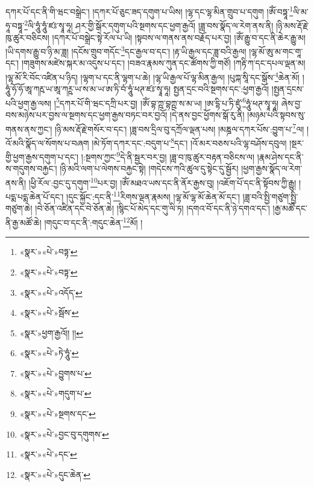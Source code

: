 དཀར་པོ་དང་ནི་གི་ཝང་བསྒྲེང་། །དཀར་པོ་ཅུང་ཟད་དགུག་པ་ཡིས། །ལྷ་དང་ལྷ་མིན་གྲུབ་པ་དགུག །ཨོཾ་བཏྟཱ་\footnote{«སྣར་»«པེ་»བཏྟ་}ལི་མ་ཧཱ་བཏྟཱ་\footnote{«སྣར་»«པེ་»བཏྟ་}ལི་ཧཱུཾ་ཧཱུཾ་ཛཿ་སྭཱ་ཧཱ། ཤར་གྱི་སྒོར་དགུག་པའི་སྔགས་དང་ཕྱག་རྒྱའོ། །ཟླ་བས་སྣོད་ལ་རེག་ནས་ནི། །ཉི་མས་རྡོ་རྗེ་ཁུ་ཚུར་བཅིངས། །དཀར་པོ་བསྒྲེང་སྟེ་རོལ་པ་ཡི། །སྟབས་ལ་གནས་ནས་བརྗོད་པར་བྱ། །ཨོཾ་རྒྱུ་བ་དང་ནི་ཆེར་རྒྱུ་མ། །ཡི་དགས་རྒྱུ་བ་ཉི་མ་ཟླ། །དངོས་གྲུབ་གདོང་\footnote{«སྣར་»«པེ་»འདོད་}དང་རྒྱལ་བ་དང་། །རྟ་ཡི་རྒྱལ་དང་ཟླ་བའི་རྒྱལ། །ལྷ་མོ་ཨུ་མ་གང་གཱ་དང་། །གཟུགས་མཛེས་སྐར་མ་འདུས་པ་དང་། །བཟའ་རྣམས་ཀུན་དང་ཚོགས་ཀྱི་གཙོ། །ཀརྟི་ཀ་དང་དཔལ་ལྡན་མ། །ལྷ་མོ་རི་བོང་འཛིན་པ་ཉིད། །ལྷག་པ་དང་ནི་ལྷག་པ་ཆེ། །ལྷ་ཡི་རྒྱལ་པོ་ལྷ་མིན་རྒྱལ། །པུཀྐ་སཱི་དང་སྒོས་\footnote{«སྣར་»«པེ་»སྦོས་}ཆེན་མོ། །ཧཱུཾ་ཧོ་ཧོ་ཨཱ་ཀརྵ་ཡ་ཨཱ་ཀཪྵ་ཡ་ས་མ་ཡ་ཨ་ཏི་བཾ་ཧཱུཾ་ཕཊ་ཛཿ་སྭཱ་ཧཱ། སྤྱན་དྲང་བའི་སྔགས་དང་:ཕྱག་རྒྱའོ། །སྤྱན་དྲངས་པའི་ཕྱག་རྒྱ་ལས། །\footnote{«སྣར་»ཕྱག་རྒྱའོ།། །།}དཀར་པོ་གི་ཝང་དཀྲི་པར་བྱ། །ཨོཾ་བྷ་ཀྵ་བྷཀྵ་ས་མ་ཡ། །ཨ་དྷི་པ་ཏི་ཛུཾ་\footnote{«སྣར་»«པེ་»ཏེ་ཧཱུཾ་}ཧཱུཾ་ཕཊ་སྭཱ་ཧཱ། ཞེས་བྱ་བས་མཉེས་པར་བྱས་ལ་སྔགས་དང་ཕྱག་རྒྱས་བཏང་བར་བྱའོ། །དེ་ནས་བྱང་ཕྱོགས་སྒོ་རུ་ནི། །མཉམ་པའི་སྟབས་སུ་གནས་ནས་ཀྱང་། །ཉི་མས་རྡོ་རྗེ་གསོར་བ་དང་། །ཟླ་བས་དྲིལ་བུ་དཀྲོལ་ལྡན་པས། །མཎྜལ་དཀར་པོས་:བྱུག་པ་\footnote{«སྣར་»«པེ་»བྱུགས་པ་}ལ། །འོ་མའི་སྣོད་ལ་སོགས་པ་བཞག །མེ་ཏོག་དཀར་དང་:བདུག་པ་\footnote{«སྣར་»«པེ་»གདུག་པ་}དང་། །འོ་མར་བཅས་པའི་ལྷ་བཤོས་དབུལ། །སྔར་གྱི་ཕྱག་རྒྱས་དགུག་པ་དང་། །:སྔགས་ཀྱང་\footnote{«སྣར་»«པེ་»སྔགས་དང་}དེ་ནི་སྦྱར་བར་བྱ། །ཟླ་བ་ཁུ་ཚུར་བརྟན་བཅིངས་ལ། །རྣམ་ཤེས་དང་ནི་ས་གདུགས་བརྐྱང་། །ཉི་མའི་ལག་པ་ལེགས་བརྐྱང་སྟེ། །གདེངས་ཀའི་ཚུལ་དུ་སྟེང་དུ་སྦྱོར། །ཕྱག་རྒྱས་སྣོད་ལ་རེག་ནས་ནི། །ཕྱི་རོལ་:བྱང་དུ་དགུག་\footnote{«སྣར་»«པེ་»བྱང་བུ་དགུགས་}པར་བྱ། །ཨོཾ་མཐའ་ཡས་དང་ནི་ནོར་རྒྱས་བུ། །འཇོག་པོ་དང་ནི་སྟོབས་ཀྱི་རྒྱུ། །པདྨ་པདྨ་ཆེན་པོ་དང་། །དུང་སྐྱོང་:དང་ནི་\footnote{«སྣར་»«པེ་»དང་}རིགས་ལྡན་རྣམས། །ལྷ་མོ་ལྷ་མོ་ཆེན་མོ་དང་། །ཟླ་བའི་སྤྱི་གཙུག་སྤྱི་གཙུག་ཆེ། །བེ་ཅོན་འཛིན་དང་བེ་ཅོན་ཆེ། །སྙིང་པོ་མེད་དང་གུ་ལི་ཏ། །དགའ་བོ་དང་ནི་ཉེ་དགའ་དང་། །རྒྱ་མཚོ་དང་ནི་རྒྱ་མཚོ་ཆེ། །གདུང་བ་དང་ནི་:གདུང་ཆེན་\footnote{«སྣར་»«པེ་»དུང་ཆེན་}མོ། །
